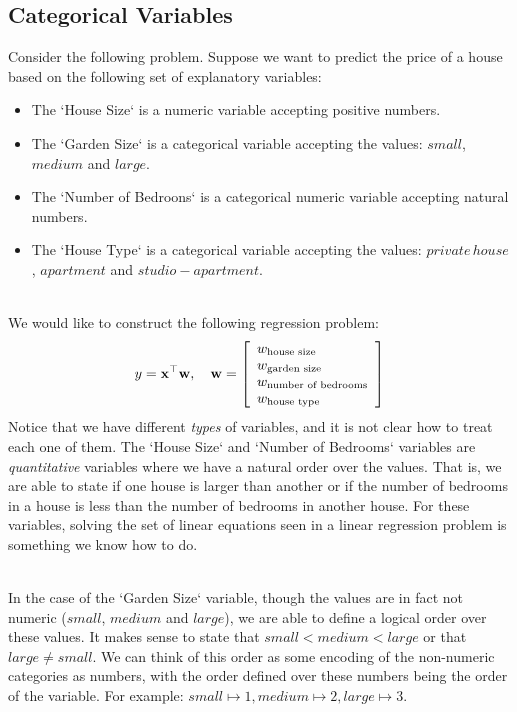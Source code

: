 

\subsection{Categorical Variables}

Consider the following problem. Suppose we want to predict the price of a house based on the following set of explanatory variables:
\begin{itemize}
	\item The `House Size` is a numeric variable accepting positive numbers.
	\item The `Garden Size` is a categorical variable accepting the values: $small$, $medium$ and $large$.
	\item The `Number of Bedroons` is a categorical numeric variable accepting natural numbers.
	\item The `House Type` is a categorical variable accepting the values: $private\,house$, $apartment$ and $studio-apartment$.
\end{itemize}

~\\We would like to construct the following regression problem: $$ y=\mathbf{x}^\top \mathbf{w},\quad \mathbf{w}=\left[\begin{array}{l}w_{\text{house size}}\\ w_{\text{garden size}}\\ w_{\text{number of bedrooms}}\\ w_{\text{house type}}\end{array}\right] $$
Notice that we have different \textit{types} of variables, and it is not clear how to treat each one of them. The `House Size` and `Number of Bedrooms` variables are \textit{quantitative} variables where we have a natural order over the values. That is, we are able to state if one house is larger than another or if the number of bedrooms in a house is less than the number of bedrooms in another house. For these variables, solving the set of linear equations seen in a linear regression problem is something we know how to do.

~\\In the case of the `Garden Size` variable, though the values are in fact not numeric ($small$, $medium$ and $large$), we are able to define a logical order over these values. It makes sense to state that $small < medium < large$ or that $large \neq small$. We can think of this order as some encoding of the non-numeric categories as numbers, with the order defined over these numbers being the order of the variable. For example: $small\mapsto 1, medium \mapsto 2, large \mapsto 3$.

